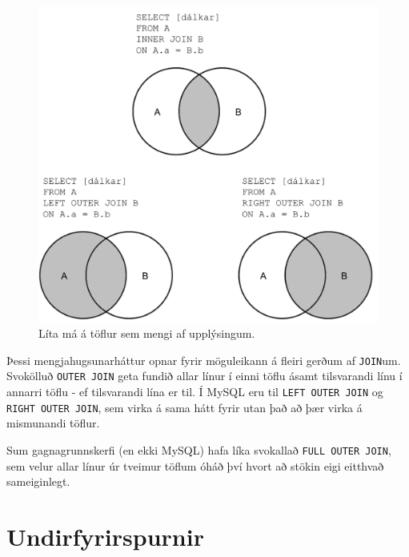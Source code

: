 \begin{figure}
\caption[Mengi]{Líta má á töflur sem mengi af upplýsingum.}
\label{mynd:join-mengi}
\centering
\includegraphics[width=\linewidth]{myndir/join-mengi}
\end{figure}

Þessi mengjahugsunarháttur opnar fyrir möguleikann á fleiri gerðum af \verb|JOIN|um. Svokölluð \verb|OUTER JOIN| geta fundið allar línur í einni töflu ásamt tilsvarandi línu í annarri töflu - ef tilsvarandi lína er til. Í MySQL eru til \verb|LEFT OUTER JOIN| og \verb|RIGHT OUTER JOIN|, sem virka á sama hátt fyrir utan það að þær virka á mismunandi töflur.

Sum gagnagrunnskerfi (en ekki MySQL) hafa líka svokallað \verb|FULL OUTER JOIN|, sem velur allar línur úr tveimur töflum óháð því hvort að stökin eigi eitthvað sameiginlegt.

\section{Undirfyrirspurnir}
\label{undirkafli:undirfyrirspurnir}





